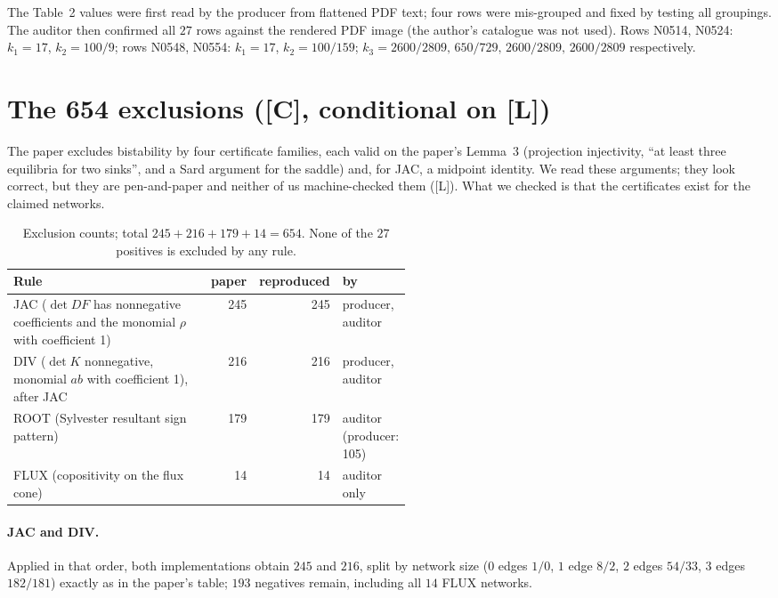 \documentclass[10pt]{article}
\newcommand{\tier}[1]{\textsf{[#1]}}
\newcommand{\tL}{\tier{L}}
\newcommand{\tC}{\tier{C}}
\begin{document}
The Table~2 values were first read by the producer from flattened PDF text; four rows were mis-grouped and fixed by testing all groupings. The auditor then confirmed all $27$ rows against the rendered PDF image (the author's catalogue was not used). Rows N0514, N0524: $k_1=17$, $k_2=100/9$; rows N0548, N0554: $k_1=17$, $k_2=100/159$; $k_3=2600/2809,\,650/729,\,2600/2809,\,2600/2809$ respectively.

\section{The 654 exclusions (\tC{}, conditional on \tL{})}\label{sec:excl}
The paper excludes bistability by four certificate families, each valid on the paper's Lemma~3 (projection injectivity, ``at least three equilibria for two sinks'', and a Sard argument for the saddle) and, for JAC, a midpoint identity. We read these arguments; they look correct, but they are pen-and-paper and neither of us machine-checked them (\tL{}). What we checked is that the certificates exist for the claimed networks.
\begin{table}[h]\centering\small
\begin{tabular}{@{}p{0.52\linewidth}rrl@{}}\toprule
Rule & paper & reproduced & by\\ \midrule
JAC ($\det DF$ has nonnegative coefficients and the monomial $\rho$ with coefficient 1) & 245 & 245 & producer, auditor\\
DIV ($\det K$ nonnegative, monomial $ab$ with coefficient 1), after JAC & 216 & 216 & producer, auditor\\
ROOT (Sylvester resultant sign pattern) & 179 & 179 & auditor (producer: 105)\\
FLUX (copositivity on the flux cone) & 14 & 14 & auditor only\\ \bottomrule
\end{tabular}
\caption{Exclusion counts; total $245+216+179+14=654$. None of the $27$ positives is excluded by any rule.}\label{tab:rules}
\end{table}
\paragraph{JAC and DIV.} Applied in that order, both implementations obtain $245$ and $216$, split by network size ($0$ edges $1/0$, $1$ edge $8/2$, $2$ edges $54/33$, $3$ edges $182/181$) exactly as in the paper's table; $193$ negatives remain, including all $14$ FLUX networks.
\end{document}
